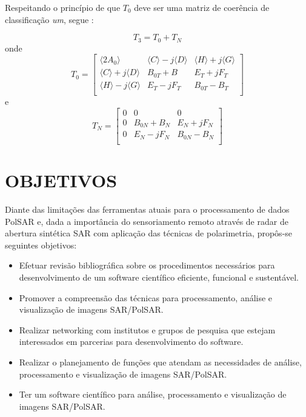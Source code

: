 \documentclass[a4paper,12pt]{article}
\begin{document}
Respeitando o princípio de que $T_{0}$ deve ser uma matriz de coerência de classificação \textit{um}, segue \cite{jong:2009}:

\begin{equation}
    T_{3} = T_{0} + T_{N}
\end{equation}
onde 
\begin{equation}
    T_{0} = 
        \begin{bmatrix}
        \langle2A_{0}\rangle & \langle C \rangle-j\langle D \rangle & \langle H \rangle+j\langle G \rangle\\
        \langle C \rangle+j\langle D \rangle & B_{0T}+B &  E_{T}+j F_{T}\\
        \langle H \rangle-j\langle G \rangle & E_{T}-j F_{T} &  B_{0T} - B_{T}\\
    \end{bmatrix}
\end{equation}
e
\begin{equation}
    T_{N} = 
        \begin{bmatrix}
        0 & 0 & 0\\
        0 & B_{0N}+B_{N} &  E_{N}+j F_{N}\\
        0 & E_{N}-j F_{N} &  B_{0N} - B_{N}\\
    \end{bmatrix}
\end{equation}

\section{OBJETIVOS}
\label{sec:Obj}

Diante das limitações das ferramentas atuais para o processamento de dados PolSAR e, dada a importância do sensoriamento remoto através de radar de abertura sintética SAR com aplicação das técnicas de polarimetria, propôs-se seguintes objetivos:

\begin{itemize}
	\item Efetuar revisão bibliográfica sobre os procedimentos necessários para desenvolvimento de um software científico eficiente, funcional e sustentável.
	\item Promover a compreensão das técnicas para processamento, análise e visualização de imagens SAR/PolSAR.
	\item Realizar networking com institutos e grupos de pesquisa que estejam interessados em parcerias para desenvolvimento do software.
	\item Realizar o planejamento de funções que atendam as necessidades de análise, processamento e visualização de imagens SAR/PolSAR.
	\item Ter um software científico para análise, processamento e visualização de imagens SAR/PolSAR.
\end{itemize}
\end{document}
